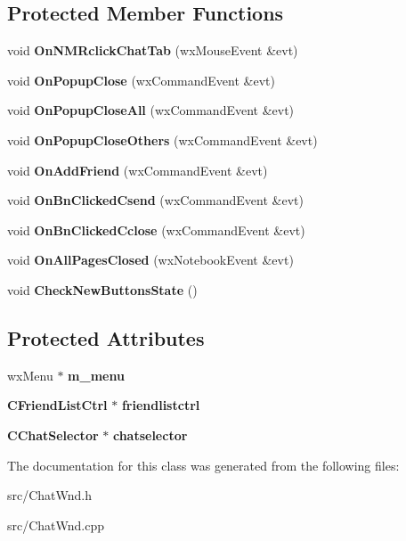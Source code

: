 \subsection*{Protected Member Functions}
\begin{DoxyCompactItemize}
\item 
void {\bf OnNMRclickChatTab} (wxMouseEvent \&evt)\label{classCChatWnd_ab540f7cfcdedd11f309222f84593612c}

\item 
void {\bf OnPopupClose} (wxCommandEvent \&evt)\label{classCChatWnd_a70dc6a93351201df3604629717323608}

\item 
void {\bf OnPopupCloseAll} (wxCommandEvent \&evt)\label{classCChatWnd_a985372ce93f5c50f79d90c763f8d0dbb}

\item 
void {\bf OnPopupCloseOthers} (wxCommandEvent \&evt)\label{classCChatWnd_afaf46437b9d5850296d0c5ec917e6da8}

\item 
void {\bf OnAddFriend} (wxCommandEvent \&evt)\label{classCChatWnd_ad083760d0111ee137027e56d203a8c0c}

\item 
void {\bfseries OnBnClickedCsend} (wxCommandEvent \&evt)\label{classCChatWnd_a190c0ebf56abda7b8738af93de9c7f89}

\item 
void {\bfseries OnBnClickedCclose} (wxCommandEvent \&evt)\label{classCChatWnd_ae1148a27734146f3773665b41b856ee6}

\item 
void {\bfseries OnAllPagesClosed} (wxNotebookEvent \&evt)\label{classCChatWnd_ae868566f63f92b0ed26ae1c9af1dd638}

\item 
void {\bfseries CheckNewButtonsState} ()\label{classCChatWnd_a8988c0370f68ddf715f9801978b49458}

\end{DoxyCompactItemize}
\subsection*{Protected Attributes}
\begin{DoxyCompactItemize}
\item 
wxMenu $\ast$ {\bf m\_\-menu}\label{classCChatWnd_a39f0018095135cf2b21e800d0af35728}

\item 
{\bf CFriendListCtrl} $\ast$ {\bf friendlistctrl}\label{classCChatWnd_a422d0a07fa60099efd91cee72530250a}

\item 
{\bf CChatSelector} $\ast$ {\bf chatselector}\label{classCChatWnd_a8b692e6646ab84f97051f85218fcb8c9}

\end{DoxyCompactItemize}


The documentation for this class was generated from the following files:\begin{DoxyCompactItemize}
\item 
src/ChatWnd.h\item 
src/ChatWnd.cpp\end{DoxyCompactItemize}
